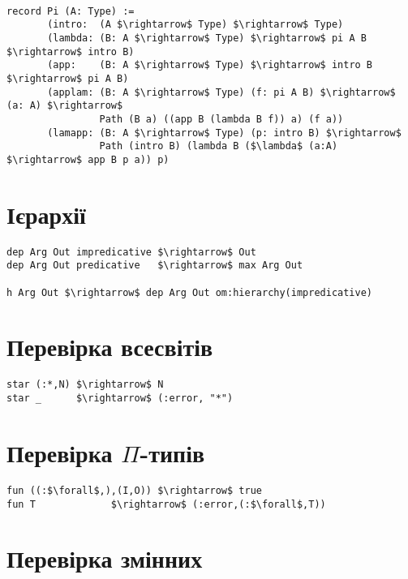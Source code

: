 \vspace{0.5cm}
\begin{lstlisting}[mathescape=true]

record Pi (A: Type) :=
       (intro:  (A $\rightarrow$ Type) $\rightarrow$ Type)
       (lambda: (B: A $\rightarrow$ Type) $\rightarrow$ pi A B $\rightarrow$ intro B)
       (app:    (B: A $\rightarrow$ Type) $\rightarrow$ intro B $\rightarrow$ pi A B)
       (applam: (B: A $\rightarrow$ Type) (f: pi A B) $\rightarrow$ (a: A) $\rightarrow$
                Path (B a) ((app B (lambda B f)) a) (f a))
       (lamapp: (B: A $\rightarrow$ Type) (p: intro B) $\rightarrow$
                Path (intro B) (lambda B ($\lambda$ (a:A) $\rightarrow$ app B p a)) p)

\end{lstlisting}

\newpage


   \section{Ієрархії}

\begin{lstlisting}[mathescape=true]
dep Arg Out impredicative $\rightarrow$ Out
dep Arg Out predicative   $\rightarrow$ max Arg Out

h Arg Out $\rightarrow$ dep Arg Out om:hierarchy(impredicative)
\end{lstlisting}

   \section{Перевірка всесвітів}

\begin{lstlisting}[mathescape=true]
star (:*,N) $\rightarrow$ N
star _      $\rightarrow$ (:error, "*")
\end{lstlisting}

   \section{Перевірка $\Pi$-типів}

\begin{lstlisting}[mathescape=true]
fun ((:$\forall$,),(I,O)) $\rightarrow$ true
fun T             $\rightarrow$ (:error,(:$\forall$,T))
\end{lstlisting}

   \section{Перевірка змінних}

